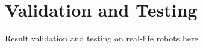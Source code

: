 \chapter{Validation and Testing} 
\label{chap:validation}

Result validation and testing on real-life robots here


